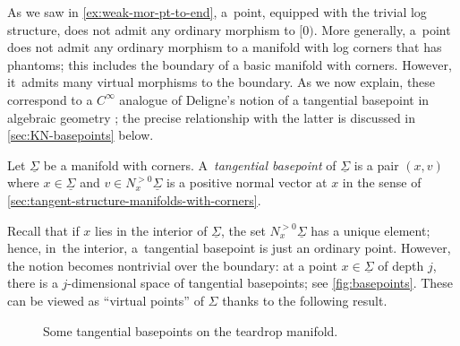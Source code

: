 \documentclass[10pt]{amsart}
\theoremstyle{definition}
\theoremstyle{remark}
\let\defn\emph
\newcommand{\Sig}{\Sigma}
\newcommand{\uSig}{\underline{\Sigma}}
\begin{document}
As we saw in \autoref{ex:weak-mor-pt-to-end}, a~point, equipped with the trivial log structure, does not admit any ordinary morphism to $[0)$. More generally, a~point does not admit any ordinary morphism to a manifold with log corners that has phantoms; this includes the boundary of a basic manifold with corners. However, it~admits many virtual morphisms to the boundary. As we now explain, these correspond to a $C^\infty$ analogue of Deligne's notion of a tangential basepoint in algebraic geometry \cite[\S 15]{Deligne1989}; the precise relationship with the latter is discussed in \autoref{sec:KN-basepoints} below.

\begin{definition}
Let $\uSig$ be a manifold with corners. A~\defn{tangential basepoint} of $\uSig$ is a pair $(x,v)$ where $x\in\uSig$ and $v\in N_x^{>0}\uSig$ is a positive normal vector at $x$ in the sense of \autoref{sec:tangent-structure-manifolds-with-corners}.
\end{definition}
Recall that if $x$ lies in the interior of $\uSig$, the set $N_x^{>0}\uSig$ has a unique element; hence, in~the interior, a~tangential basepoint is just an ordinary point. However, the notion becomes nontrivial over the boundary: at a point $x \in \uSig$ of depth $j$, there is a $j$-dimensional space of tangential basepoints; see \autoref{fig:basepoints}.
These can be viewed as ``virtual points'' of $\Sig$ thanks to the following result.

\begin{figure}
\caption{Some tangential basepoints on the teardrop manifold.}\label{fig:basepoints}
\end{figure}
\end{document}
